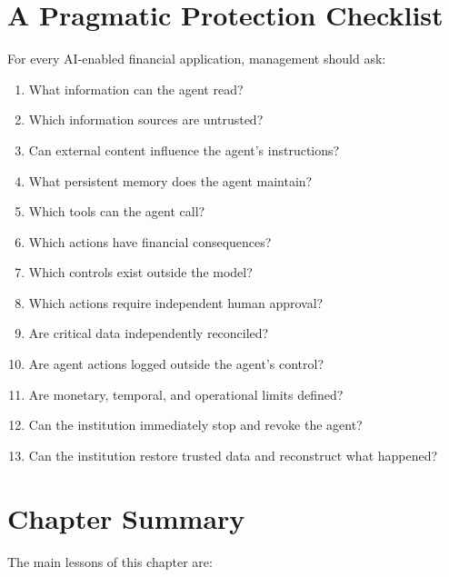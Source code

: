 \section{A Pragmatic Protection Checklist}

For every AI-enabled financial application, management should ask:

\begin{enumerate}
    \item What information can the agent read?
    \item Which information sources are untrusted?
    \item Can external content influence the agent's instructions?
    \item What persistent memory does the agent maintain?
    \item Which tools can the agent call?
    \item Which actions have financial consequences?
    \item Which controls exist outside the model?
    \item Which actions require independent human approval?
    \item Are critical data independently reconciled?
    \item Are agent actions logged outside the agent's control?
    \item Are monetary, temporal, and operational limits defined?
    \item Can the institution immediately stop and revoke the agent?
    \item Can the institution restore trusted data and reconstruct what happened?
\end{enumerate}

\section{Chapter Summary}

The main lessons of this chapter are:

